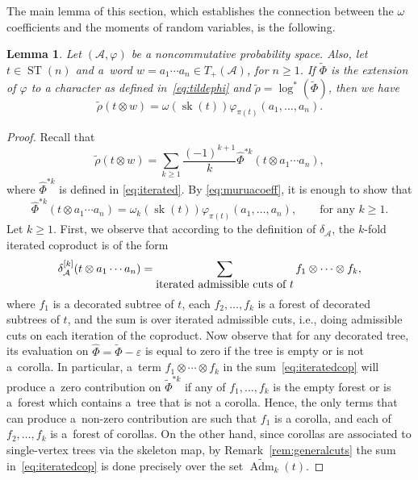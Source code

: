 \documentclass[11pt]{article}
\numberwithin{equation}{section}
\numberwithin{equation}{section}
\newtheorem{Lemma}[Theorem]{Lemma}
\newcommand{\A}{\mathcal{A}}
\newcommand{\ST}{\operatorname{ST}}
\newcommand{\sk}{\operatorname{sk}}
\newcommand{\AdmT}{\widetilde{\operatorname{Adm}}}
\begin{document}
The main lemma of this section, which establishes the connection between the $\omega$ coefficients and the moments of random variables, is the following.

\begin{Lemma}
\label{lemma:main}
Let $(\A,\varphi)$ be a noncommutative probability space. Also, let $t \in \ST(n)$ and a~word $w=a_1\cdots a_n\in T_+(\A)$, for $n\geq1$. If $\tilde{\Phi}$ is the extension of $\varphi$ to a character as defined in~\eqref{eq:tildephi} and $\tilde\rho = \log^*(\tilde{\Phi})$, then we have
\begin{equation} \label{eq:tilderho10}
 \tilde\rho(t\otimes w) = \omega(\sk(t)) \varphi_{\pi(t)}(a_1,\dots,a_n).
\end{equation}
\end{Lemma}

\begin{proof}
Recall that
\[
	\tilde\rho(t\otimes w) = \sum_{k\geq 1} \frac{(-1)^{k+1}}{k} \hat\Phi^{*k} (t\otimes a_1\cdots a_n),
\]
where $\hat\Phi^{*k}$ is defined in \eqref{eq:iterated}. By \eqref{eq:muruacoeff}, it is enough to show that
\begin{equation}\label{eq:enough}
	\hat\Phi^{*k} (t\otimes a_1\cdots a_n) = \omega_k(\sk(t)) \varphi_{\pi(t)}(a_1,\dots,a_n),\qquad\mbox{for any }k\geq1.
\end{equation}
Let $k\geq 1$. First, we observe that according to the definition of $\delta_\A$, the $k$-fold iterated coproduct is of the form
\begin{equation}\label{eq:iteratedcop}
	\delta_\A^{[k]}(t\otimes a_1\cdots a_n) = \sum_{\mbox{\tiny{iterated admissible cuts of $t$}}}
	f_1\otimes\cdots \otimes f_k,
\end{equation}
where $f_1$ is a decorated subtree of $t$, each $f_2,\dots,f_k$ is a forest of decorated subtrees of $t$, and the sum is over iterated admissible cuts, i.e., doing admissible cuts on each iteration of the coproduct. Now observe that for any decorated tree, its evaluation on $\hat\Phi = \tilde\Phi - \varepsilon$ is equal to zero if the tree is empty or is not a~corolla. In particular, a~term $f_1\otimes\cdots \otimes f_k$ in the sum~\eqref{eq:iteratedcop} will produce a~zero contribution on $\tilde\Phi^{*k}$ if any of $f_1,\dots,f_k$ is the empty forest or is a~forest which contains a~tree that is not a corolla. Hence, the only terms that can produce a~non-zero contribution are such that $f_1$ is a corolla, and each of $f_2,\dots,f_k$ is a~forest of corollas. On the other hand, since corollas are associated to single-vertex trees via the skeleton map, by Remark~\ref{rem:generalcuts} the sum in~\eqref{eq:iteratedcop} is done precisely over the set $\AdmT_k(t)$.


\end{proof}
\end{document}
